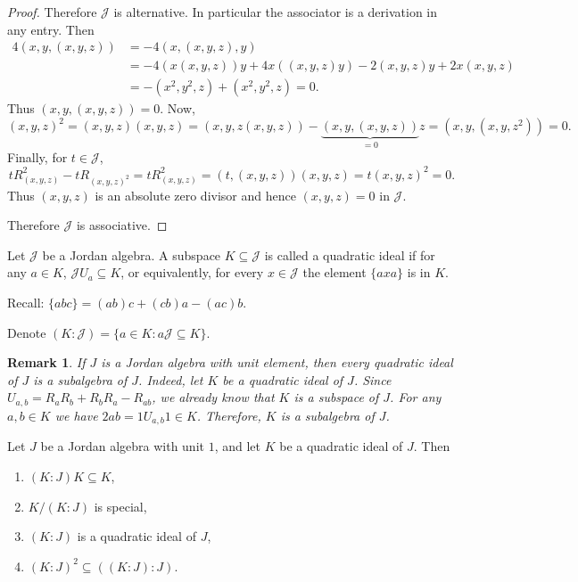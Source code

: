 \documentclass{article}
\newtheorem{remark}[theorem]{Remark}
\begin{document}
\begin{proof}
Therefore $\mathcal{J}$ is alternative. In particular the associator is a derivation in any entry. Then
\[
\begin{aligned}
4(x,y,(x,y,z)) &= -4(x,(x,y,z),y) \\
&= -4(x(x,y,z))y+4x((x,y,z)y)-2(x,y,z)y+2x(x,y,z) \\
&= -\left(x^2,y^2,z\right)+\left(x^2,y^2,z\right)=0.
\end{aligned}
\]
Thus $(x,y,(x,y,z))=0$. Now,
\[
(x,y,z)^2=(x,y,z)(x,y,z)=(x,y,z(x,y,z))-\underbrace{(x,y,(x,y,z))}_{=0}z=\left(x,y,\left(x,y,z^2\right)\right)=0.
\]
Finally, for $t \in \mathcal{J}$,
\[
tR_{(x,y,z)}^2 - tR_{(x,y,z)^2} = tR_{(x,y,z)}^2 = (t,(x,y,z))(x,y,z)=t(x,y,z)^2=0.
\]
Thus $(x,y,z)$ is an absolute zero divisor and hence $(x,y,z)=0$ in $\mathcal{J}$.

Therefore $\mathcal{J}$ is associative.
\end{proof}

\begin{definition}
Let $\mathcal{J}$ be a Jordan algebra. A subspace $K \subseteq \mathcal{J}$ is called a quadratic ideal if for any $a \in K$, $\mathcal{J} U_a \subseteq K$, or equivalently, for every $x \in \mathcal{J}$ the element $\{a x a\}$ is in $K$.

Recall: $\{a b c\}=(a b) c+(c b) a-(a c) b$.
\end{definition}

Denote $(K : \mathcal{J}) = \{ a \in K : a \mathcal{J} \subseteq K \}$.

\begin{remark}
If $J$ is a Jordan algebra with unit element, then every quadratic ideal of $J$ is a subalgebra of $J$. Indeed, let $K$ be a quadratic ideal of $J$. Since $U_{a,b}=R_aR_b+R_bR_a-R_{ab}$, we already know that $K$ is a subspace of $J$. For any $a,b\in K$ we have $2ab=1U_{a,b}1\in K$. Therefore, $K$ is a subalgebra of $J$.
\end{remark}

\begin{lemma}
Let $J$ be a Jordan algebra with unit $1$, and let $K$ be a quadratic ideal of $J$. Then
\begin{enumerate}
\item[(i)] $(K:J)K\subseteq K$,
\item[(ii)] $K/(K:J)$ is special,
\item[(iii)] $(K:J)$ is a quadratic ideal of $J$,
\item[(iv)] $(K:J)^2\subseteq((K:J):J)$.
\end{enumerate}
\end{lemma}
\end{document}
